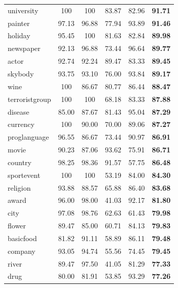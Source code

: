 \begin{table}[h]
\begin{center}
\begin{tabular}{|l||c|c|c|c||c|}
    university        &    100  &    100  &  83.87  &  82.96  &  \textbf{91.71} \\
    painter           &  97.13  &  96.88  &  77.94  &  93.89  &  \textbf{91.46} \\
    holiday           &  95.45  &    100  &  81.63  &  82.84  &  \textbf{89.98} \\
    newspaper         &  92.13  &  96.88  &  73.44  &  96.64  &  \textbf{89.77} \\
    actor             &  92.74  &  92.24  &  89.47  &  83.33  &  \textbf{89.45} \\
    skybody           &  93.75  &  93.10  &  76.00  &  93.84  &  \textbf{89.17} \\
    wine              &    100  &  86.67  &  80.77  &  86.44  &  \textbf{88.47} \\
    terroristgroup    &    100  &    100  &  68.18  &  83.33  &  \textbf{87.88} \\
    disease           &  85.00  &  87.67  &  81.43  &  95.04  &  \textbf{87.29} \\
    currency          &    100  &  90.00  &  70.00  &  89.06  &  \textbf{87.27} \\
    proglanguage      &  96.55  &  86.67  &  73.44  &  90.97  &  \textbf{86.91} \\
    movie             &  90.23  &  87.06  &  93.62  &  75.91  &  \textbf{86.71} \\
    country           &  98.25  &  98.36  &  91.57  &  57.75  &  \textbf{86.48} \\
    sportevent        &    100  &    100  &  53.19  &  84.00  &  \textbf{84.30} \\
    religion          &  93.88  &  88.57  &  65.88  &  86.40  &  \textbf{83.68} \\
    award             &  96.00  &  98.00  &  41.03  &  92.17  &  \textbf{81.80} \\
    city              &  97.08  &  98.76  &  62.63  &  61.43  &  \textbf{79.98} \\
    flower            &  89.47  &  85.00  &  60.71  &  84.13  &  \textbf{79.83} \\
    basicfood         &  81.82  &  91.11  &  58.89  &  86.11  &  \textbf{79.48} \\
    company           &  93.05  &  94.74  &  55.56  &  74.45  &  \textbf{79.45} \\
    river             &  89.47  &  97.50  &  41.05  &  81.29  &  \textbf{77.33} \\
    drug              &  80.00  &  81.91  &  53.85  &  93.29  &  \textbf{77.26} \\

\end{tabular}
\end{center}
\end{table}
